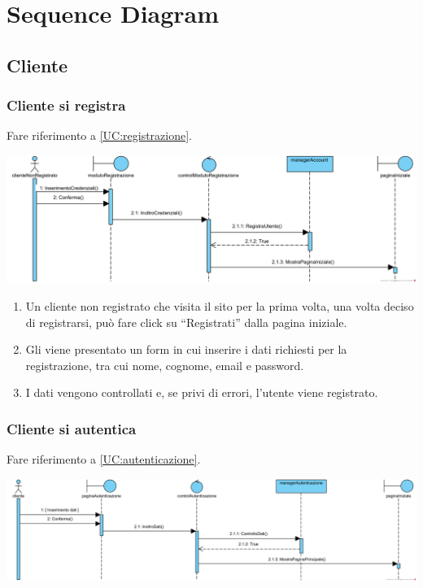 \documentclass[12pt,a4paper]{article}
\begin{document}
\newpage

\section{Sequence Diagram}
\subsection{Cliente}
\subsubsection{Cliente si registra}
\label{SD:registrazione}

Fare riferimento a \ref{UC:registrazione}. \\

\begin{center}
\includegraphics[width=\textwidth]{SequenceDiagram/ClienteRegistrazione}
\end{center}

\begin{enumerate}
\item Un cliente non registrato che visita il sito per la prima volta, una volta deciso di registrarsi, può fare click su ``Registrati'' dalla pagina iniziale.
\item Gli viene presentato un form in cui inserire i dati richiesti per la registrazione, tra cui nome, cognome, email e password.
\item I dati vengono controllati e, se privi di errori, l'utente viene registrato.
\end{enumerate}

\subsubsection{Cliente si autentica}
\label{SD:login}

Fare riferimento a \ref{UC:autenticazione}. \\

\begin{center}
\includegraphics[width=\textwidth]{SequenceDiagram/ClienteAutenticazione}
\end{center}
\end{document}
